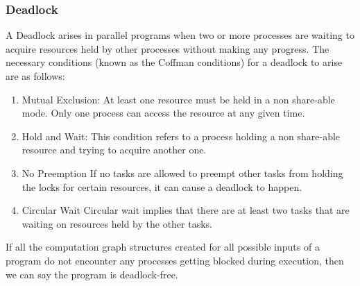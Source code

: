 \subsubsection{Deadlock}
A Deadlock arises in parallel programs when two or more processes are waiting to acquire resources held by other processes without making any progress. The necessary conditions (known as the Coffman conditions) for a deadlock to arise are as follows:
\begin{enumerate}
\item 
{Mutual Exclusion:} At least one resource must be held in a non share-able mode. Only one process can access the resource at any given time. 
\item
{Hold and Wait:} This condition refers to a process holding a non share-able resource and trying to acquire another one.
\item
{No Preemption}
If no tasks are allowed to preempt other tasks from holding the locks for certain resources, it can cause a deadlock to happen.
\item
{Circular Wait} Circular wait implies that there are at least two tasks that are waiting on resources held by the other tasks.
\end{enumerate}
If all the computation graph structures created for all possible inputs of a program do not encounter any processes getting blocked during execution, then we can say the program is deadlock-free.
